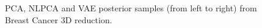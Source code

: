 \begin{figure}
  \centering
   \caption{PCA, NLPCA and VAE posterior samples (from left to right) from Breast Cancer 3D reduction.}\label{fig:breast_posterior_3D}
\end{figure}
